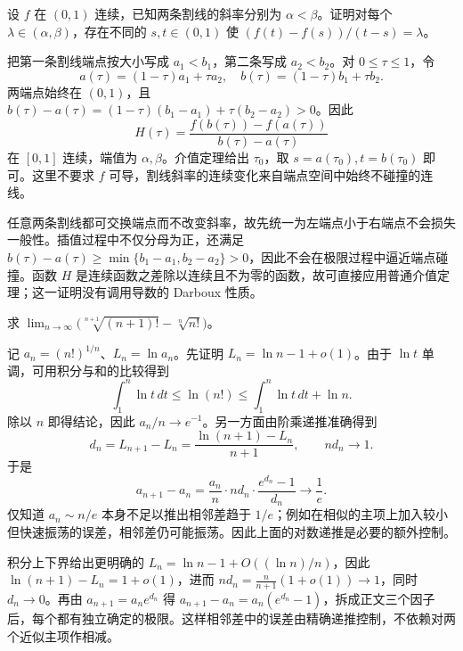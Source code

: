 \documentclass[12pt,fontset=fandol]{ctexart}
\begin{document}
\begin{example}\label{nm-final9-2}
设 $f$ 在 $(0,1)$ 连续，已知两条割线的斜率分别为 $\alpha<\beta$。证明对每个 $\lambda\in(\alpha,\beta)$，存在不同的 $s,t\in(0,1)$ 使 $(f(t)-f(s))/(t-s)=\lambda$。
\end{example}
\begin{solve}
把第一条割线端点按大小写成 $a_1<b_1$，第二条写成 $a_2<b_2$。对 $0\leq\tau\leq1$，令
\[
 a(\tau)=(1-\tau)a_1+\tau a_2,
 \quad b(\tau)=(1-\tau)b_1+\tau b_2.
\]
两端点始终在 $(0,1)$，且 $b(\tau)-a(\tau)=(1-\tau)(b_1-a_1)+\tau(b_2-a_2)>0$。因此
\[
 H(\tau)=\frac{f(b(\tau))-f(a(\tau))}{b(\tau)-a(\tau)}
\]
在 $[0,1]$ 连续，端值为 $\alpha,\beta$。介值定理给出 $\tau_0$，取 $s=a(\tau_0),t=b(\tau_0)$ 即可。这里不要求 $f$ 可导，割线斜率的连续变化来自端点空间中始终不碰撞的连线。

任意两条割线都可交换端点而不改变斜率，故先统一为左端点小于右端点不会损失一般性。插值过程中不仅分母为正，还满足 $b(\tau)-a(\tau)\ge\min\{b_1-a_1,b_2-a_2\}>0$，因此不会在极限过程中逼近端点碰撞。函数 $H$ 是连续函数之差除以连续且不为零的函数，故可直接应用普通介值定理；这一证明没有调用导数的 Darboux 性质。

\end{solve}

\begin{example}\label{nm-final9-4}
求 $\displaystyle\lim_{n\to\infty}\bigl(\sqrt[n+1]{(n+1)!}-\sqrt[n]{n!}\bigr)$。
\end{example}
\begin{solve}
记 $a_n=(n!)^{1/n}$、$L_n=\ln a_n$。先证明 $L_n=\ln n-1+o(1)$。由于 $\ln t$ 单调，可用积分与和的比较得到
\[
 \int_1^n\ln t\,dt\leq\ln(n!)\leq\int_1^n\ln t\,dt+\ln n.
\]
除以 $n$ 即得结论，因此 $a_n/n\to e^{-1}$。另一方面由阶乘递推准确得到
\[
 d_n=L_{n+1}-L_n=\frac{\ln(n+1)-L_n}{n+1},
 \qquad nd_n\to1.
\]
于是
\[
 a_{n+1}-a_n=\frac{a_n}{n}\cdot n d_n\cdot\frac{e^{d_n}-1}{d_n}
 \longrightarrow\frac1e.
\]
仅知道 $a_n\sim n/e$ 本身不足以推出相邻差趋于 $1/e$；例如在相似的主项上加入较小但快速振荡的误差，相邻差仍可能振荡。因此上面的对数递推是必要的额外控制。

积分上下界给出更明确的 $L_n=\ln n-1+O((\ln n)/n)$，因此 $\ln(n+1)-L_n=1+o(1)$，进而 $nd_n=\frac n{n+1}(1+o(1))\to1$，同时 $d_n\to0$。再由 $a_{n+1}=a_ne^{d_n}$ 得 $a_{n+1}-a_n=a_n(e^{d_n}-1)$，拆成正文三个因子后，每个都有独立确定的极限。这样相邻差中的误差由精确递推控制，不依赖对两个近似主项作相减。

\end{solve}
\end{document}
